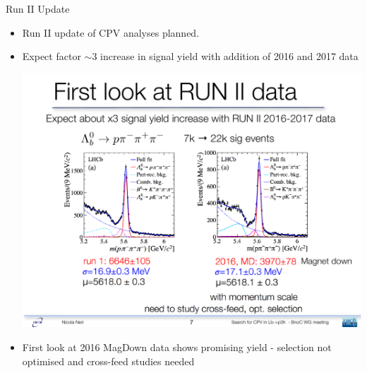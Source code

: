 \documentclass{beamer}
\begin{document}
\begin{frame}{Run II Update}
  \small
  \begin{itemize}
  \item Run II update of CPV analyses planned.
  \item Expect factor $\sim3$ increase in signal yield with addition of 2016 and 2017 data
  \begin{center}
    \includegraphics[width=.8\textwidth]{Run2FirstLook.pdf}
  \end{center}
  \item First look at 2016 MagDown data shows promising yield - selection not optimised and cross-feed studies needed
  \end{itemize}
\end{frame}
\end{document}
